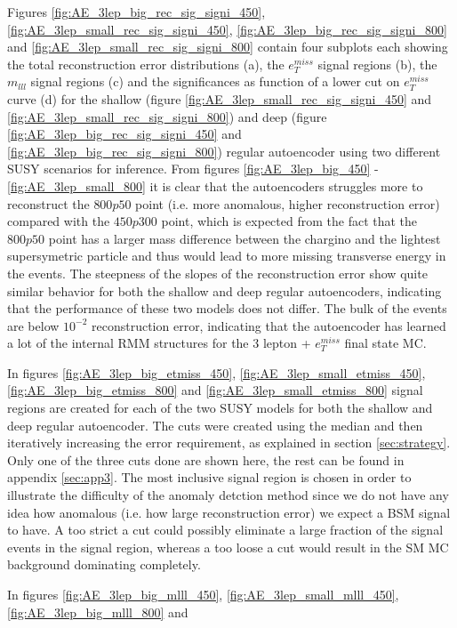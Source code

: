 Figures \ref{fig:AE_3lep_big_rec_sig_signi_450}, \ref{fig:AE_3lep_small_rec_sig_signi_450}, 
\ref{fig:AE_3lep_big_rec_sig_signi_800} and \ref{fig:AE_3lep_small_rec_sig_signi_800} contain four 
subplots each showing the total reconstruction error distributions (a), the $e_T^{miss}$ signal regions (b), 
the $m_{lll}$ signal regions (c) and the significances as function of a lower cut on $e_T^{miss}$ curve (d) 
for the shallow (figure \ref{fig:AE_3lep_small_rec_sig_signi_450} and \ref{fig:AE_3lep_small_rec_sig_signi_800}) 
and deep (figure \ref{fig:AE_3lep_big_rec_sig_signi_450} and \ref{fig:AE_3lep_big_rec_sig_signi_800}) regular autoencoder
using two different SUSY scenarios for inference. 
From figures \ref{fig:AE_3lep_big_450} - \ref{fig:AE_3lep_small_800} it is clear that the 
autoencoders struggles more to reconstruct the $800p50$ point (i.e. more anomalous, higher reconstruction error) 
compared with the $450p300$ point, which is expected from the fact that the $800p50$ point has a larger 
mass difference between the chargino and the lightest supersymetric particle and thus would lead to more missing 
transverse energy in the events. The steepness of the 
slopes of the reconstruction error show quite similar behavior for both the shallow and deep regular autoencoders, 
indicating that the performance of these two models does not differ. 
The bulk of the events are below $10^{-2}$ reconstruction error, indicating that the autoencoder 
has learned a lot of the internal RMM structures for the 3 lepton + $e_T^{miss}$ final state MC. \par
In figures \ref{fig:AE_3lep_big_etmiss_450}, \ref{fig:AE_3lep_small_etmiss_450}, 
\ref{fig:AE_3lep_big_etmiss_800} and  \ref{fig:AE_3lep_small_etmiss_800} signal regions 
are created for each of the two SUSY models for both the shallow and deep regular autoencoder. The cuts 
were created using the median and then iteratively increasing the error requirement, as 
explained in section \ref{sec:strategy}. Only one of the three cuts done are shown here, the 
rest can be found in appendix \ref{sec:app3}. The most inclusive signal region is chosen in order to 
illustrate the difficulty of the anomaly detction method since we do not have 
any idea how anomalous (i.e. how large reconstruction error) we expect a BSM signal to have. 
A too strict a cut could possibly eliminate a large fraction of the 
signal events in the signal region, whereas a too loose a cut would result in the SM MC background dominating completely. \par
In figures \ref{fig:AE_3lep_big_mlll_450}, \ref{fig:AE_3lep_small_mlll_450}, \ref{fig:AE_3lep_big_mlll_800} and  

